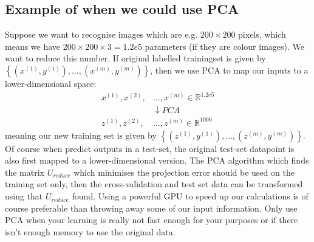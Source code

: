 \documentclass[a4paper, 10pt,hidelinks]{article}
\newcommand{\R}{\mathbb{R}}
\newcommand{\ind}[1]{^{(#1)}}
\begin{document}
\subsection{Example of when we could use PCA}
Suppose we want to recognise images which are e.g. $200 \times 200$ pixels, which means we have $200 \times 200 \times 3 = 1.2e5$ parameters (if they are colour images). We want to reduce this number. If original labelled trainingset is given by $\left\{(x\ind{1}, y\ind{1}), \ldots, (x\ind{m}, y\ind{m})\right\}$, then we use PCA to map our inputs to a lower-dimensional space:
\begin{align}
x\ind{1}, x\ind{2}, &\ldots, x\ind{m} \in \R^{1.2e5} \nonumber \\
&\downarrow PCA \nonumber \\
z\ind{1}, z\ind{2}, &\ldots, z\ind{m} \in \R^{1000}
\end{align}
meaning our new training set is given by $\left\{(z\ind{1}, y\ind{1}), \ldots, (z\ind{m}, y\ind{m})\right\}$. Of course when predict outputs in a test-set, the original test-set datapoint is also first mapped to a lower-dimensional version. The PCA algorithm which finds the matrix $U_{reduce}$ which minimises the projection error should be used on the training set only, then the cross-validation and test set data can be transformed using that $U_{reduce}$ found. Using a powerful GPU to speed up our calculations is of course preferable than throwing away some of our input information. Only use PCA when your learning is really not fast enough for your purposes or if there isn't enough memory to use the original data. 

 
\end{document}

